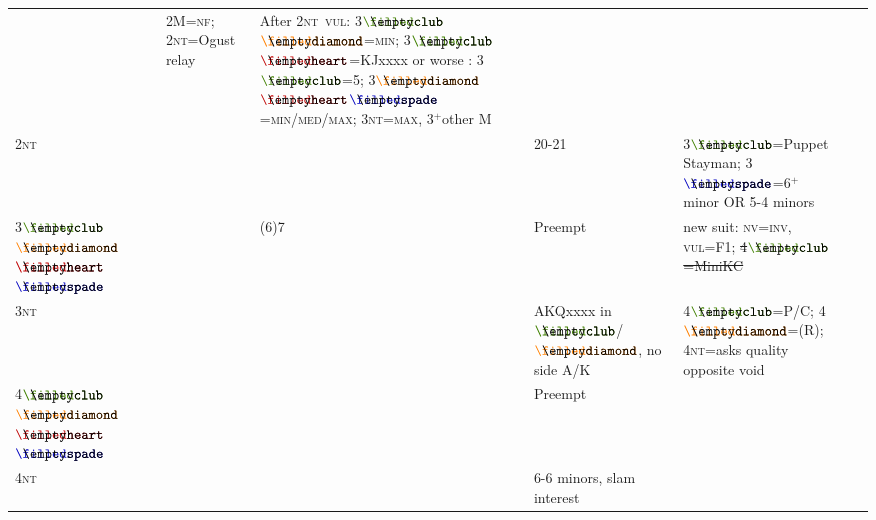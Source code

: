 \documentclass{article}
\newcommand\coloredsuitsymbol[3]{\ensuremath{\mathrel{\raisebox{-0.3pt}{{\color{#1}#2}\llap{#3}}}}}
\newcommand\suitsymbol[3]{\coloredsuitsymbol{#1}{#2}{#3}}%
\newcommand\C{\suitsymbol{clubcolor}{\filledclub}{\emptyclub}}
\newcommand\D{\suitsymbol{diamondcolor}{\filleddiamond}{\emptydiamond}}
\renewcommand\H{\suitsymbol{heartcolor}{\filledheart}{\emptyheart}}
\renewcommand\S{\suitsymbol{spadecolor}{\filledspade}{\emptyspade}}
\newcommand\N{\caps{nt}}
\newcommand\caps[1]{{\scshape#1}}
\newcommand\Min{\caps{min}}
\newcommand\NF{\caps{nf}}
\newcommand\VUL{\caps{vul}}
\newcommand\NV{\caps{nv}}
\newcommand\INV{\caps{inv}}
\newcommand\more{\ensuremath{^+}}
\newcommand\alert{\makebox[1.0em][c]{\hspace{-0.5ex}
	\makebox[0pt][c]{\raisebox{0em}{\scriptsize!}}%
	\makebox[0pt][c]{\raisebox{-.1em}{\color{red}\large$\bigtriangleup$}}}}%
\begin{document}
\begin{tabular}{ M{8mm} M{10mm} R{7mm} !{\hspace{2mm}} M{10mm}  M{53mm}  M{80mm}  M{80mm} M{35mm} }
		&2M=\NF; 2\N=Ogust relay&After 2\N\ \VUL: 3\C\D=\Min; 3\C\H=KJxxxx or worse\newline
		\quad \NV: 3\C=5; 3\D\H\S=\caps{min/med/max}; 3\N=\caps{max}, 3\more other M& \\ 
	2\N &&&&20-21&3\C=Puppet Stayman; 3\S=6\more minor OR 5-4 minors&& \\  
	3\C\D\H\S &&(6)7&&Preempt&new suit: \NV=\INV, \VUL=F1; \sout{4\C=MiniKC}&& \\ 
	3\N &\alert&&&AKQxxxx in \C/\D, no side A/K&4\C=\caps{P/C}; 4\D=(R); 4\N=asks quality opposite void&& \\ 
	4\C\D\H\S &&&&Preempt&&& \\ 
	4\N &&&&6-6 minors, slam interest&&& \\ 
	\midrule
\end{tabular}
\end{document}
